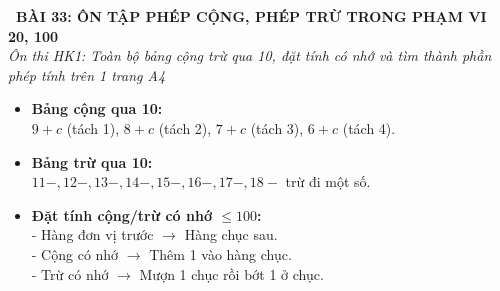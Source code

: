 \documentclass[11pt,a4paper]{article}
\begin{document}
\begin{tcolorbox}[
  enhanced,
  colback=violet!8!white,
  colframe=violet!70!black,
  arc=3mm, boxrule=1.2pt,
  left=3mm, right=3mm, top=2mm, bottom=2mm,
  halign=center
]
  {\LARGE\bfseries\color{violet!90!black}\faBookmark\ BÀI 33: ÔN TẬP PHÉP CỘNG, PHÉP TRỪ TRONG PHẠM VI 20, 100}\\[1mm]
  {\itshape\footnotesize\color{black!75} Ôn thi HK1: Toàn bộ bảng cộng trừ qua 10, đặt tính có nhớ và tìm thành phần phép tính trên 1 trang A4}
\end{tcolorbox}

\vspace{-2mm}

\noindent
\begin{minipage}[t]{0.49\textwidth}\vspace{0pt}
\begin{tcolorbox}[
  enhanced,
  colback=violet!4!white,
  colframe=violet!75!black,
  arc=2mm, boxrule=0.8pt,
  left=2mm, right=2mm, top=1.8mm, bottom=1.8mm,
  title={\footnotesize\bfseries\color{white}\faKey\ 1. Các bảng tính cốt lõi}
]
{\footnotesize
\begin{itemize}\setlength{\itemsep}{1pt}\setlength{\leftskip}{-2.5mm}
  \item \textbf{Bảng cộng qua 10:}\\
  $9+c$ (tách 1), $8+c$ (tách 2), $7+c$ (tách 3), $6+c$ (tách 4).
  \item \textbf{Bảng trừ qua 10:}\\
  $11-, 12-, 13-, 14-, 15-, 16-, 17-, 18-$ trừ đi một số.
  \item \textbf{Đặt tính cộng/trừ có nhớ $\le 100$:}\\
  - Hàng đơn vị trước $\to$ Hàng chục sau.\\
  - Cộng có nhớ $\to$ Thêm 1 vào hàng chục.\\
  - Trừ có nhớ $\to$ Mượn 1 chục rồi bớt 1 ở chục.
\end{itemize}
}
\end{tcolorbox}
\end{minipage}
\hfill
\end{document}
